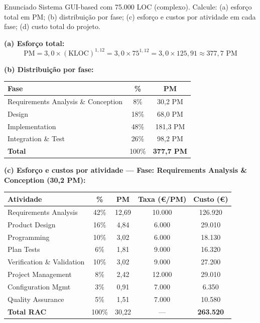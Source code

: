 \documentclass[12pt,a4paper]{article}
\begin{document}
\begin{questao}{Enunciado}
Sistema GUI-based com 75.000 LOC (complexo). Calcule: (a) esforço total em
PM; (b) distribuição por fase; (c) esforço e custos por atividade em cada
fase; (d) custo total do projeto.
\end{questao}

\textbf{(a) Esforço total:}
\[
  \text{PM} = 3{,}0 \times (\text{KLOC})^{1{,}12}
             = 3{,}0 \times 75^{1{,}12}
             = 3{,}0 \times 125{,}91
             \approx \boxed{377{,}7 \text{ PM}}
\]

\textbf{(b) Distribuição por fase:}

\begin{center}
\begin{tabular}{lcc}
\toprule
\textbf{Fase} & \textbf{\%} & \textbf{PM} \\
\midrule
Requirements Analysis \& Conception & 8\% & 30,2 PM \\
Design & 18\% & 68,0 PM \\
Implementation & 48\% & 181,3 PM \\
Integration \& Test & 26\% & 98,2 PM \\
\midrule
\textbf{Total} & 100\% & \textbf{377,7 PM} \\
\bottomrule
\end{tabular}
\end{center}

\textbf{(c) Esforço e custos por atividade — Fase: Requirements Analysis \& Conception (30,2 PM):}

\begin{center}\small
\begin{tabular}{lcccc}
\toprule
\textbf{Atividade} & \textbf{\%} & \textbf{PM} & \textbf{Taxa (€/PM)} & \textbf{Custo (€)} \\
\midrule
Requirements Analysis  & 42\% & 12,69 & 10.000 & 126.920 \\
Product Design         & 16\% &  4,84 &  6.000 &  29.010 \\
Programming            & 10\% &  3,02 &  6.000 &  18.130 \\
Plan Tests             &  6\% &  1,81 &  9.000 &  16.320 \\
Verification \& Validation & 10\% & 3,02 & 9.000 & 27.200 \\
Project Management     &  8\% &  2,42 & 12.000 &  29.010 \\
Configuration Mgmt     &  3\% &  0,91 &  7.000 &   6.350 \\
Quality Assurance      &  5\% &  1,51 &  7.000 &  10.580 \\
\midrule
\textbf{Total RAC}     & 100\% & 30,22 & --- & \textbf{263.520} \\
\bottomrule
\end{tabular}
\end{center}
\end{document}
